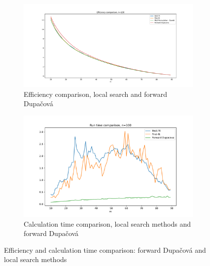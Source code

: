 \documentclass{amsart}
\begin{document}
\begin{figure}[ht]
    \centering
    \begin{subfigure}[b]{0.45\textwidth}
        \centering
        \includegraphics[width=\textwidth]{plots/milp local search efficiency.pdf}
        \caption{Efficiency comparison, local search and forward Dupačová}
        \label{value loc s}
    \end{subfigure}
    \hfill
    \begin{subfigure}[b]{0.45\textwidth}
        \centering
        \includegraphics[width=\textwidth]{plots/run time local search.pdf}
        \caption{Calculation time comparison, local search methods and forward Dupačová}
        \label{time loc s}
    \end{subfigure}
    \caption{Efficiency and calculation time comparison: forward Dupačová and local search methods}
    \label{comparison loc}
\end{figure}
\end{document}
